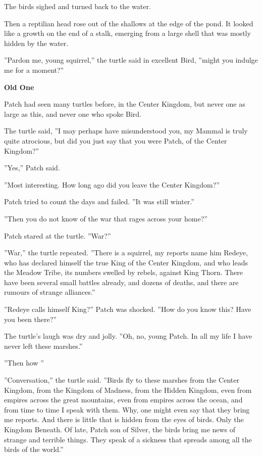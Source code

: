 \documentclass[11pt]{article}
\begin{document}
The birds sighed and turned back to the water.\par
Then a reptilian head rose out of the shallows at the edge of the pond. It looked like a growth on the end of a stalk, emerging from a large shell that was mostly hidden by the water.\par
''Pardon me, young squirrel,'' the turtle said in excellent Bird, ''might you indulge me for a moment?''\par
\par
{\bf Old One\par
}\par
 Patch had seen many turtles before, in the Center Kingdom, but never one as large as this, and never one who spoke Bird.\par
 The turtle said, ''I may perhaps have misunderstood you, my Mammal is truly quite atrocious, but did you just say that you were Patch, of the Center Kingdom?''\par
 ''Yes,'' Patch said.\par
 ''Most interesting. How long ago did you leave the Center Kingdom?''\par
 Patch tried to count the days and failed. ''It was still winter.''\par
 ''Then you do not know of the war that rages across your home?''\par
 Patch stared at the turtle. ''War?''\par
 ''War,'' the turtle repeated. ''There is a squirrel, my reports name him Redeye, who has declared himself the true King of the Center Kingdom, and who leads the Meadow Tribe, its numbers swelled by rebels, against King Thorn. There have been several small battles already, and dozens of deaths, and there are rumours of strange alliances.''\par
 ''Redeye calls himself King?'' Patch was shocked. ''How do you know this? Have you been there?''\par
 The turtle's laugh was dry and jolly. ''Oh, no, young Patch. In all my life I have never left these marshes.''\par
''Then how %
''\par
''Conversation,'' the turtle said. ''Birds fly to these marshes from the Center Kingdom, from the Kingdom of Madness, from the Hidden Kingdom, even from empires across the great mountains, even from empires across the ocean, and from time to time I speak with them. Why, one might even say that they bring me reports. And there is little that is hidden from the eyes of birds. Only the Kingdom Beneath. Of late, Patch son of Silver, the birds bring me news of strange and terrible things. They speak of a sickness that spreads among all the birds of the world.''\par
\end{document}
